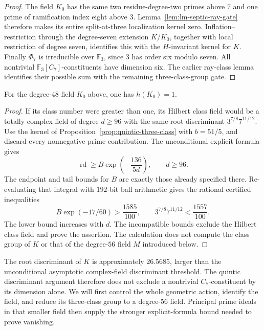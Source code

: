 \begin{proof}
The field $K_0$ has the same two residue-degree-two
primes above $7$ and one prime of ramification index
eight above $3$.  Lemma~\ref{lem:lm-septic-ray-gate}
therefore makes its entire split-at-three localization
kernel zero.  Inflation--restriction through the
degree-seven extension $K/K_0$, together with local
restriction of degree seven, identifies this with the
$H$-invariant kernel for $K$.
Finally $\Phi_7$ is irreducible over $\mathbb F_3$,
since $3$ has order six modulo seven.  All nontrivial
$\mathbb F_3[C_7]$-constituents have dimension six.
The earlier ray-class lemma identifies their possible
sum with the remaining three-class-group gate.
\end{proof}

\begin{corollary}\label{cor:septic-auxiliary-class-one}
For the degree-$48$ field $K_0$ above, one has $h(K_0)=1$.
\end{corollary}
\begin{proof}
If its class number were greater than one, its Hilbert class
field would be a totally complex field of degree $d\ge96$
with the same root discriminant
$3^{7/8}7^{11/12}$. Use the kernel of
Proposition~\ref{prop:quintic-three-class} with $b=51/5$,
and discard every nonnegative prime contribution. The
unconditional explicit formula gives
\[
 \operatorname{rd}\ge B\exp\!\left(-\frac{136}{5d}\right),
 \qquad d\ge96.
\]
The endpoint and tail bounds for $B$ are exactly those already
specified there. Re-evaluating that integral with $192$-bit
ball arithmetic gives the rational certified inequalities
\[
 B\exp(-17/60)>\frac{1585}{100},
 \qquad 3^{7/8}7^{11/12}<\frac{1557}{100}.
\]
The lower bound increases with $d$. The incompatible bounds
exclude the Hilbert class field and prove the assertion.
The calculation does not compute the class group of $K$ or that of
the degree-$56$ field $M$ introduced below.
\end{proof}

\begin{remark}
\label{rem:septic-smaller-field}
The root discriminant of $K$ is approximately $26.5685$, larger
than the unconditional asymptotic complex-field discriminant threshold.
The quintic discriminant argument therefore does not exclude a
nontrivial $C_7$-constituent by its dimension alone. We will first
control the whole geometric action, identify the field, and reduce
its three-class group to a degree-$56$ field. Principal prime ideals
in that smaller field then supply the stronger explicit-formula bound
needed to prove vanishing.
\end{remark}

